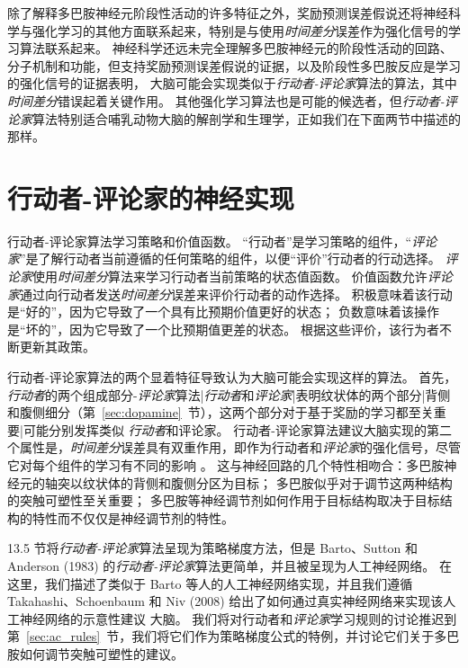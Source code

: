 除了解释多巴胺神经元阶段性活动的许多特征之外，奖励预测误差假说还将神经科学与强化学习的其他方面联系起来，特别是与使用\textit{时间差分}误差作为强化信号的学习算法联系起来。
神经科学还远未完全理解多巴胺神经元的阶段性活动的回路、分子机制和功能，但支持奖励预测误差假说的证据，以及阶段性多巴胺反应是学习的强化信号的证据表明， 大脑可能会实现类似于\textit{行动者-评论家}算法的算法，其中\textit{时间差分}错误起着关键作用。
其他强化学习算法也是可能的候选者，但\textit{行动者-评论家}算法特别适合哺乳动物大脑的解剖学和生理学，正如我们在下面两节中描述的那样。



\section{行动者-评论家的神经实现} \label{sec:neural_ac}

行动者-评论家算法学习策略和价值函数。
“行动者”是学习策略的组件，“\textit{评论家}”是了解行动者当前遵循的任何策略的组件，以便“评价”行动者的行动选择。
\textit{评论家}使用\textit{时间差分}算法来学习行动者当前策略的状态值函数。
价值函数允许\textit{评论家}通过向行动者发送\textit{时间差分}误差来评价行动者的动作选择。
积极意味着该行动是“好的”，因为它导致了一个具有比预期价值更好的状态；
负数意味着该操作是“坏的”，因为它导致了一个比预期值更差的状态。
根据这些评价，该行为者不断更新其政策。


行动者-评论家算法的两个显着特征导致认为大脑可能会实现这样的算法。
首先，\textit{行动者}的两个组成部分-\textit{评论家}算法|\textit{行动者}和\textit{评论家}|表明纹状体的两个部分|背侧和腹侧细分（第~\ref{sec:dopamine}~节），这两个部分对于基于奖励的学习都至关重要|可能分别发挥类似 \textit{行动者}和评论家。
行动者-评论家算法建议大脑实现的第二个属性是，\textit{时间差分}误差具有双重作用，即作为行动者和\textit{评论家}的强化信号，尽管它对每个组件的学习有不同的影响 。
这与神经回路的几个特性相吻合：多巴胺神经元的轴突以纹状体的背侧和腹侧分区为目标；
多巴胺似乎对于调节这两种结构的突触可塑性至关重要；
多巴胺等神经调节剂如何作用于目标结构取决于目标结构的特性而不仅仅是神经调节剂的特性。


13.5 节将\textit{行动者-评论家}算法呈现为策略梯度方法，但是 Barto、Sutton 和 Anderson (1983) 的\textit{行动者-评论家}算法更简单，并且被呈现为人工神经网络。
在这里，我们描述了类似于 Barto 等人的人工神经网络实现，并且我们遵循 Takahashi、Schoenbaum 和 Niv (2008) 给出了如何通过真实神经网络来实现该人工神经网络的示意性建议 大脑。
我们将对行动者和\textit{评论家}学习规则的讨论推迟到第~\ref{sec:ac_rules}~节，我们将它们作为策略梯度公式的特例，并讨论它们关于多巴胺如何调节突触可塑性的建议。


